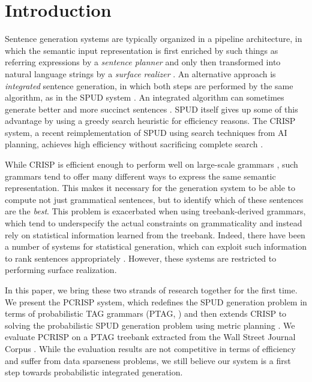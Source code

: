 \section{Introduction}

Sentence generation systems are typically organized in a pipeline
architecture, in which the semantic input representation is first
enriched by such things as referring expressions by a \emph{sentence
  planner} and only then transformed into natural language strings by
a \emph{surface realizer} \cite{reiterdale2000}.  An alternative
approach is \emph{integrated} sentence generation, in which both steps
are performed by the same algorithm, as in the SPUD system
\cite{Stone2003a}.  An integrated algorithm can sometimes generate
better and more succinct sentences \cite{stone98textual}.  SPUD itself
gives up some of this advantage by using a greedy search heuristic
for efficiency reasons.  The CRISP system, a recent reimplementation
of SPUD using search techniques from AI planning, achieves high
efficiency without sacrificing complete search
\cite{kollerstone2007,KolHof10}.

While CRISP is efficient enough to perform well on large-scale
grammars \cite{kollerpetrick2009}, such grammars tend to offer many
different ways to express the same semantic representation.  This
makes it necessary for the generation system to be able to compute not
just grammatical sentences, but to identify which of these sentences
are the \emph{best}. This problem is exacerbated when using
treebank-derived grammars, which tend to underspecify the actual
constraints on grammaticality and instead rely on statistical
information learned from the treebank.  Indeed, there have been a
number of systems for statistical generation, which can exploit such
information to rank sentences appropriately
\cite{langkildeknight1998,whitebaldridge2003,belz2008}.  However,
these systems are restricted to performing surface realization.

In this paper, we bring these two strands of research together for the
first time.  We present the PCRISP system, which redefines the SPUD
generation problem in terms of probabilistic TAG grammars (PTAG,
\cite{resnik1992}) and then extends CRISP to solving the probabilistic
SPUD generation problem using metric planning \cite{fox2002,hoffmann2003}.  We
evaluate PCRISP on a PTAG treebank extracted from the Wall Street
Journal Corpus \cite{chenschanker2004}.  While the evaluation results
are not competitive in terms of efficiency and suffer from data
sparseness problems, we still believe our system is a first step
towards probabilistic integrated generation.

